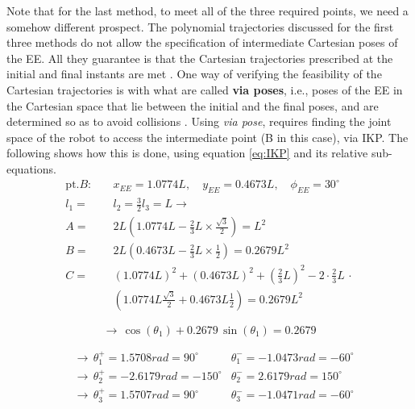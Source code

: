 \documentclass[conference]{IEEEtran}
\begin{document}
Note that for the last method, to meet all of the three required points, we need a somehow different prospect. The polynomial trajectories discussed for the first three methods do not allow the specification of intermediate Cartesian poses of the EE. All they guarantee is that the Cartesian trajectories prescribed at the initial and final instants are met \cite{b1}. One way of verifying the feasibility of the Cartesian trajectories is with what are called \textbf{via poses}, i.e., poses of the EE in the Cartesian space that lie between the initial and the final poses, and are determined so as to avoid collisions \cite{b8}.
Using \textit{via pose}, requires finding the joint space of the robot to access the intermediate point (B in this case), via IKP. The following shows how this is done, using equation \ref{eq:IKP} and its relative sub-equations.
\begin{align*}
    \text{pt.} B:\quad & x_{EE} = 1.0774L,\quad y_{EE} = 0.4673L,\quad \phi_{EE} = 30^\circ         \\
    l_1 = \,           & l_2 = \frac{3}{2}l_3 = L \rightarrow                                       \\
    A = \,             & 2L(1.0774L - \frac{2}{3}L \times \frac{\sqrt{3}}{2}) = L^2                 \\
    B = \,             & 2L(0.4673L - \frac{2}{3}L \times \frac{1}{2}) = 0.2679L^2                  \\
    C = \,             & (1.0774L)^2 + (0.4673L)^2 + (\frac{2}{3}L)^2 - 2\cdot\frac{2}{3}L \, \cdot \\
                       & (1.0774L \frac{\sqrt{3}}{2} + 0.4673L \frac{1}{2}) = 0.2679L^2
\end{align*}
\begin{large}
    \setlength{\abovedisplayshortskip}{-4pt}
    \setlength{\belowdisplayshortskip}{-4pt}
    \[
        \rightarrow \, \cos (\theta_1) + 0.2679 \, \sin (\theta_1) = 0.2679
    \]
\end{large}
\begin{align*}
     & \rightarrow \, \theta_1^+ = 1.5708 rad = 90^\circ \quad\quad & \theta_1^- = -1.0473 rad = -60^\circ \\
     & \rightarrow \, \theta_2^+ = -2.6179 rad = -150^\circ         & \theta_2^- = 2.6179 rad = 150^\circ  \\
     & \rightarrow \, \theta_3^+ = 1.5707 rad = 90^\circ            & \theta_3^- = -1.0471 rad = -60^\circ \\
\end{align*}
\end{document}
